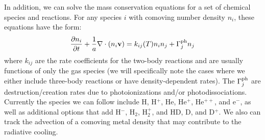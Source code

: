 
In addition, we can solve the mass conservation equations for a set of
chemical species and reactions.  For any species $i$ with comoving
number density $n_i$, these equations have the form:
\begin{equation}
  \frac{\partial n_i}{\partial t} 
  + \frac{1}{a} \nabla \cdot (n_i \vecv) = 
  k_{ij}(T) n_i n_j + \Gamma^{\rm ph}_j n_j 
  \label{eq:species_evolution}
\end{equation}
where $k_{ij}$ are the rate coefficients for the two-body reactions
and are usually functions of only the gas species (we will
specifically note the cases where we either include three-body
reactions or have density-dependent rates).  The $\Gamma^{\rm ph}_j$
are destruction/creation rates due to photoionizations and/or
photodissociations.  Currently the species we can follow include H,
H$^+$, He, He$^+$, He$^{++}$, and e$^-$, as well as additional options
that add H$^-$, H$_2$, H$_2^+$, and HD, D, and D$^+$.  We also can
track the advection of a comoving metal density that may contribute to
the radiative cooling.



%

